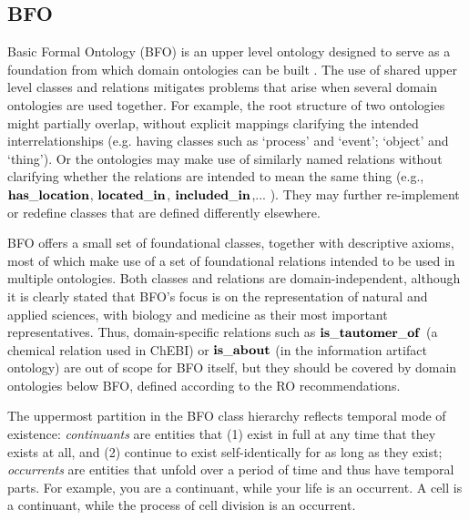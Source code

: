\subsection*{BFO}

Basic Formal Ontology (BFO) is an upper level ontology designed to serve as a foundation from which domain ontologies can be built \cite{BFO2:Graz}. The use of shared upper level classes and relations mitigates problems that arise when several domain ontologies are used together.
For example, the root structure of two ontologies might partially overlap, without explicit mappings clarifying the intended interrelationships (e.g. having classes such as `process' and `event'; `object' and `thing'). Or the ontologies may make use of similarly named relations without clarifying whether the relations are intended to mean the same thing 
(e.g., $\mathrm{\mathbf{has\_location}}$, $\mathrm{\mathbf{located\_in}}$, $\mathrm{\mathbf{included\_in}}$,... ). They may further re-implement or redefine classes that are defined differently elsewhere.

BFO offers a small set of foundational classes, together with descriptive axioms, most of which make use of a set of foundational relations
intended to be used in multiple ontologies. Both classes and relations are domain-independent, although it is clearly stated that BFO's focus is on the representation of natural and applied sciences, with biology and medicine as their most important representatives.  
Thus, domain-specific relations such as $\mathrm{\mathbf{is\_tautomer\_of}}$ (a chemical relation used in ChEBI) or $\mathrm{\mathbf{is\_about}}$ (in the information artifact ontology) are out of scope for BFO itself, but they should be covered by domain ontologies below BFO, defined according to the RO recommendations.  

The uppermost partition in the BFO class hierarchy reflects temporal mode of existence: \textit{continuants} are entities that (1) exist in full at any time that they exists at all, and (2) continue to exist self-identically for as long as they exist; \textit{occurrents} are entities that unfold over a period of time and thus have temporal parts. For example, you are a continuant, while your life is an occurrent.  A cell is a continuant, while the process of cell division is an occurrent.  

